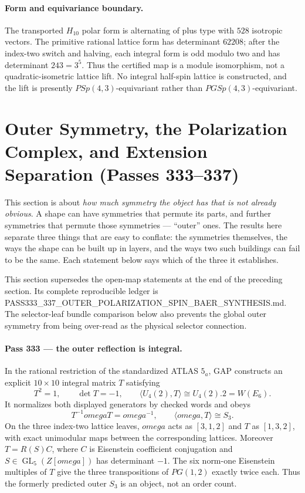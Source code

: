 \documentclass[12pt,a4paper]{article}
\def\mathbb#1{#1}%
\def\mathrm#1{#1}%
\def\texttt#1{#1}%
\def\omega{omega}%
\theoremstyle{definition}
\newcommand{\PG}{\mathrm{PG}}
\newcommand{\PSp}{\mathrm{PSp}}
\newcommand{\ZZ}{\mathbb{Z}}
\begin{document}
\paragraph{Form and equivariance boundary.}
The transported $H_{10}$ polar form is alternating of plus type with $528$
isotropic vectors. The primitive rational lattice form has determinant $62208$;
after the index-two switch and halving, each integral form is odd modulo two and
has determinant $243=3^5$. Thus the certified map is a module isomorphism, not a
quadratic-isometric lattice lift. No integral half-spin lattice is constructed,
and the lift is presently $\PSp(4,3)$-equivariant rather than
$\mathrm{PGSp}(4,3)$-equivariant.

\section{Outer Symmetry, the Polarization Complex, and Extension Separation
  (Passes 333--337)}

\begin{plainbox}
This section is about \emph{how much symmetry the object has that is not
already obvious}. A shape can have symmetries that permute its parts, and further
symmetries that permute those symmetries --- ``outer'' ones. The results here separate
three things that are easy to conflate: the symmetries themselves, the ways the shape can
be built up in layers, and the ways two such buildings can fail to be the same. Each
statement below says which of the three it establishes.
\end{plainbox}


This section supersedes the open-map statements at the end of the preceding
section.  Its complete reproducible ledger is
\texttt{PASS333\_337\_OUTER\_POLARIZATION\_SPIN\_BAER\_SYNTHESIS.md}.
The selector-leaf bundle comparison below also prevents the global outer
symmetry from being over-read as the physical selector connection.

\paragraph{Pass 333 --- the outer reflection is integral.}
In the rational restriction of the standardized ATLAS $5_a$, GAP constructs an
explicit $10\times10$ integral matrix $T$ satisfying
\[
 T^2=1,\qquad \det T=-1,\qquad
 \langle U_4(2),T\rangle\cong U_4(2).2=W(E_6).
\]
It normalizes both displayed generators by checked words and obeys
\[
 T^{-1}\omega T=\omega^{-1},\qquad
 \langle\omega,T\rangle\cong S_3.
\]
On the three index-two lattice leaves, $\omega$ acts as $[3,1,2]$ and $T$ as
$[1,3,2]$, with exact unimodular maps between the corresponding lattices.
Moreover $T=R(S)C$, where $C$ is Eisenstein coefficient conjugation and
$S\in\operatorname{GL}_5(\ZZ[\omega])$ has determinant $-1$.  The six
norm-one Eisenstein multiples of $T$ give the three transpositions of
$\PG(1,2)$ exactly twice each.  Thus the formerly predicted outer $S_3$ is an
object, not an order count.
\end{document}
